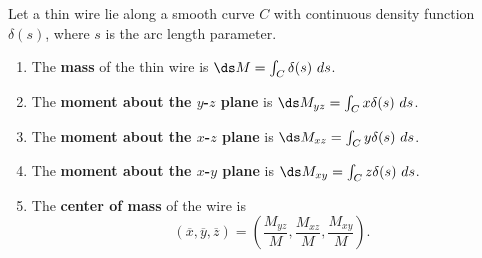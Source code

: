 {Let a thin wire lie along a smooth curve $C$ with continuous density function $\delta(s)$, where $s$ is the arc length parameter. 	%
\begin{enumerate}
	\item The \textbf{mass} of the thin wire is $\ds M = \int_C \delta(s)\ ds$.
	\item	The \textbf{moment about the $y$-$z$ plane} is $\ds M_{yz} = \int_C x\delta(s)\ ds$.
	
	\item	The \textbf{moment about the $x$-$z$ plane} is $\ds M_{xz} = \int_C y\delta(s)\ ds$.
	\item	The \textbf{moment about the $x$-$y$ plane} is $\ds M_{xy} = \int_C z\delta(s)\ ds$.
	\item The \textbf{center of mass} of the wire is $$(\overline{x},\overline{y},\overline{z}) = \left(\frac{M_{yz}}M, \frac{M_{xz}}M,\frac{M_{xy}}M\right).$$
\end{enumerate}
}

